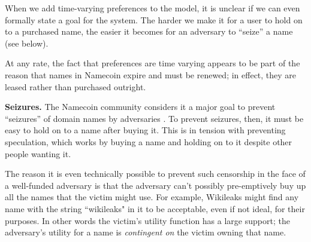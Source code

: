 When we add time-varying preferences to the model, it is unclear if we can even formally state a goal for the system. The harder we make it for a user to hold on to a purchased name, the easier it becomes for an adversary to ``seize'' a name (see below).

At any rate, the fact that preferences are time varying appears to be part of the reason that names in Namecoin expire and must be renewed; in effect, they are leased rather than purchased outright.

{\bf Seizures.} The Namecoin community considers it a major goal to prevent ``seizures'' of domain names by adversaries \cite{}. To prevent seizures, then, it must be easy to hold on to a name after buying it. This is in tension with preventing speculation, which works by buying a name and holding on to it despite other people wanting it.

The reason it is even technically possible to prevent such censorship in the face of a well-funded adversary is that the adversary can't possibly pre-emptively buy up all the names that the victim might use. For example, Wikileaks might find any name with the string ``wikileaks" in it to be acceptable, even if not ideal, for their purposes. In other words the victim's utility function has a large support; the adversary's utility for a name is {\em contingent on} the victim owning that name.







